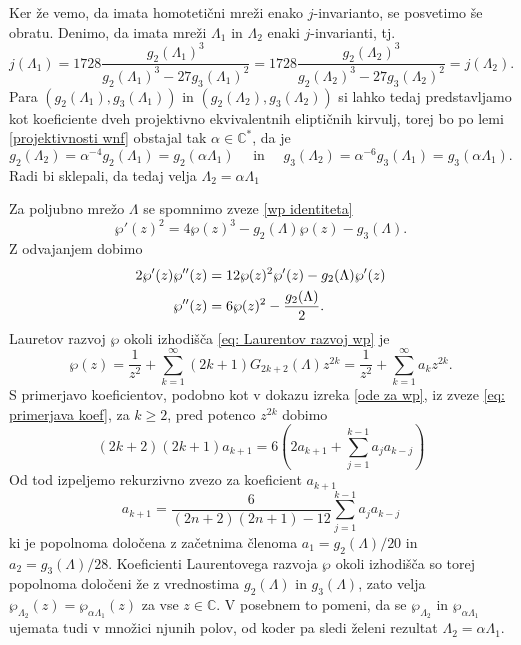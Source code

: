 \documentclass[mat1]{fmfdelo}
\numberwithin{equation}{section}
\newcommand{\C}{\mathbb C}
\newcommand{\HH}{\mathfrak{H}}
\newcommand{\CM}{\mathbb C ^*}
\newcommand{\htp}{\simeq}
\newcommand{\lattice}[2]{\left\langle #1, #2 \right\rangle}
\newcommand{\tj}{tj.\ }
\theoremstyle{definition}
\begin{document}
\begin{dokaz}
    Ker že vemo, da imata homotetični mreži enako $j$-invarianto, se posvetimo še obratu. Denimo, da imata mreži $\Lambda_1$ in $\Lambda_2$ enaki $j$-invarianti, \tj
    \[
        j(\Lambda_1) = 
        1728\frac{g_2(\Lambda_1)^3}{g_2(\Lambda_1)^3 - 27g_3(\Lambda_1)^2} =
        1728\frac{g_2(\Lambda_2)^3}{g_2(\Lambda_2)^3 - 27g_3(\Lambda_2)^2} = 
        j(\Lambda_2).
    \]
    Para $(g_2(\Lambda_1), g_3(\Lambda_1))$ in $(g_2(\Lambda_2), g_3(\Lambda_2))$ si lahko tedaj predstavljamo kot koeficiente dveh projektivno ekvivalentnih eliptičnih kirvulj, torej bo po lemi \ref{projektivnosti wnf} obstajal tak $\alpha \in \CM$, da je 
    \[
        g_2(\Lambda_2) = \alpha^{-4}g_2(\Lambda_1) = g_2(\alpha\Lambda_1) 
        \quad \text{ in } \quad
        g_3(\Lambda_2) = \alpha^{-6}g_3(\Lambda_1) = g_3(\alpha\Lambda_1). 
    \]
    Radi bi sklepali, da tedaj velja $\Lambda_2 = \alpha\Lambda_1$ 

    Za poljubno mrežo $\Lambda$ se spomnimo zveze \eqref{wp identiteta}
    \[
        \wp'(z)^2 = 4\wp(z)^3 - g_2(\Lambda)\wp(z) - g_3(\Lambda). 
    \]
    Z odvajanjem dobimo 
    \begin{align}
        \notag 2\wp'(z)\wp''(z) &= 12\wp(z)^2\wp'(z) - g_2(\Lambda)\wp'(z) \\
        \label{eq: primerjava koef} \wp''(z) &= 6\wp(z)^2 - \frac{g_2(\Lambda)}{2}.
    \end{align}
    Lauretov razvoj $\wp$ okoli izhodišča \eqref{eq: Laurentov razvoj wp} je
    \[
        \wp(z) = \frac{1}{z^2} + \sum_{k = 1}^\infty (2k+1)G_{2k+2}(\Lambda)z^{2k} = \frac{1}{z^2} + \sum_{k = 1}^\infty a_{k}z^{2k}.
    \] 
    S primerjavo koeficientov, podobno kot v dokazu izreka \ref{ode za wp}, iz zveze \eqref{eq: primerjava koef}, za $k \geq 2$, pred potenco $z^{2k}$ dobimo 
    \[
        (2k + 2)(2k + 1)a_{k+1} = 6 \left(2a_{k+1} + \sum_{j = 1}^{k-1}a_j a_{k-j}\right)
    \]
    Od tod izpeljemo rekurzivno zvezo za koeficient $a_{k+1}$
    \[
        a_{k+1} = \frac{6}{(2n + 2)(2n + 1) - 12}\sum_{j = 1}^{k-1}a_j a_{k-j}
    \]
    ki je popolnoma določena z začetnima členoma $a_1 = g_2(\Lambda)/20$ in $a_2 = g_3(\Lambda)/28$. Koeficienti Laurentovega razvoja $\wp$ okoli izhodišča so torej popolnoma določeni že z vrednostima $g_2(\Lambda)$ in $g_3(\Lambda)$, zato velja $\wp_{\Lambda_2}(z) = \wp_{\alpha\Lambda_1}(z)$ za vse $z \in \C$. V posebnem to pomeni, da se $\wp_{\Lambda_2}$ in $\wp_{\alpha\Lambda_1}$ ujemata tudi v množici njunih polov, od koder pa sledi želeni rezultat $\Lambda_2 = \alpha\Lambda_1$.
\end{dokaz}
\end{document}
